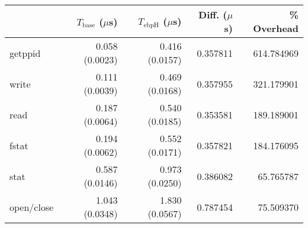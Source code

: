 \begin{tabular}{>{\ttfamily}lrrrr}
\toprule
\multicolumn{1}{l}{System Call} & $T_\text{base}$ ($\mu$s) & $T_\text{ebpH}$ ($\mu$s) &  Diff. ($\mu$s) &  \% Overhead \\
\midrule
                        getppid &           0.058 (0.0023) &           0.416 (0.0157) &        0.357811 &   614.784969 \\
                          write &           0.111 (0.0039) &           0.469 (0.0168) &        0.357955 &   321.179901 \\
                           read &           0.187 (0.0064) &           0.540 (0.0185) &        0.353581 &   189.189001 \\
                          fstat &           0.194 (0.0062) &           0.552 (0.0171) &        0.357821 &   184.176095 \\
                           stat &           0.587 (0.0146) &           0.973 (0.0250) &        0.386082 &    65.765787 \\
                     open/close &           1.043 (0.0348) &           1.830 (0.0567) &        0.787454 &    75.509370 \\
\bottomrule
\end{tabular}

